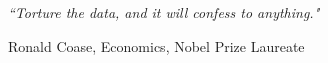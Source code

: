 \documentclass[12pt, oneside]{Thesis} %
\begin{document}
\textit{``Torture the data, and it will confess to anything."}

\begin{flushright}
Ronald Coase, Economics, Nobel Prize Laureate
\end{flushright}

\vfill\vfill\vfill\vfill\vfill\vfill\null %

\clearpage %



\end{document}
